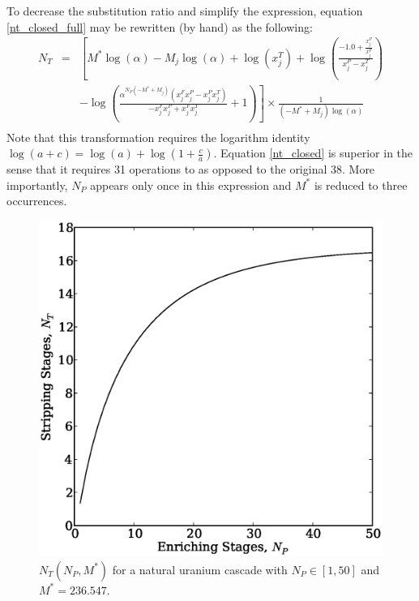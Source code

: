 \documentclass{ansconf}
\begin{document}
To decrease the substitution ratio and simplify the expression, equation 
\ref{nt_closed_full} may be rewritten (by hand) as the following:
\begin{equation}
\begin{array}{lcl}
N_T & = & \left[M^{*} \log{\left (\alpha \right )} - M_{j} \log{\left (\alpha \right )} + \log{\left (x^{T}_{j} \right )} + \log{\left (\frac{-1.0 + \frac{x^{P}_{j}}{x^{F}_{j}}}{x^{P}_{j} - x^{T}_{j}} \right )}  \right. \\
& & \left. - \log{\left (\frac{\alpha^{N_{P} \left(- M^{*} + M_{j}\right)} \left(x^{F}_{j} x^{P}_{j} - x^{P}_{j} x^{T}_{j}\right)}{- x^{F}_{j} x^{P}_{j} + x^{F}_{j} x^{T}_{j}} + 1 \right )}\right] \times \frac{1}{\left(- M^{*} + M_{j}\right) \log{\left (\alpha \right )}} \\
\end{array}
\label{nt_closed}
\end{equation}
Note that this transformation requires the logarithm identity 
$\log(a+c) = \log(a) + \log(1 + \frac{c}{a})$.  Equation \ref{nt_closed} is superior
in the sense that it requires 31 operations to as opposed to the original 38.
More importantly, $N_P$ appears only once in this 
expression and $M^*$ is reduced to three occurrences.

\begin{figure}[htpb]
\begin{center}
\includegraphics[scale=0.5]{nt_closed.eps}
\caption{$N_T(N_P, M^*)$ for a natural uranium cascade with $N_P\in[1,50]$ and 
    $M^*=236.547$.}
\label{nt_closed_fig}
\end{center}
\end{figure}
\end{document}
